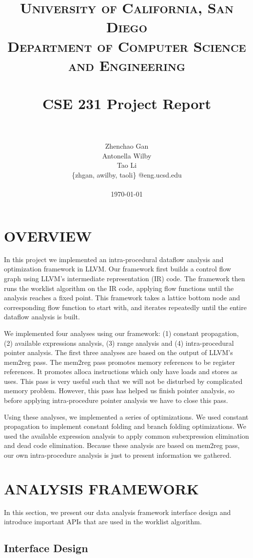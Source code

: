 \documentclass[paper=letter, fontsize=11pt]{scrartcl}
\title{
		\vspace{-0.5in} 	
		\usefont{OT1}{bch}{b}{n}
		\normalfont \normalsize \textsc{University of California, San Diego \\
								Department of Computer Science and Engineering } \\ [25pt]
		\horrule{0.5pt} \\[0.4cm]
		\huge CSE 231 Project Report\\
		\horrule{2pt} \\[0.5cm]
}
\author{
		\normalfont 						\normalsize
        				Zhenchao Gan\\[-3pt]		\normalsize
				Antonella Wilby\\[-3pt]		\normalsize
        				Tao Li\\[-3pt]				\normalsize
				\{zhgan, awilby, taoli\} @eng.ucsd.edu \\ \\
       		 \today
}
\date{}
\numberwithin{equation}{section}		%
\numberwithin{figure}{section}			%
\numberwithin{table}{section}				%
\begin{document}
\maketitle
\section{OVERVIEW}

In this project we implemented an intra-procedural dataflow analysis and optimization framework in LLVM.  Our framework first builds a control flow graph using LLVM's intermediate representation (IR) code. The framework then runs the worklist algorithm on the IR code, applying flow functions until the analysis reaches a fixed point. This framework takes a lattice bottom node and corresponding flow function to start with, and iterates repeatedly until the entire dataflow analysis is built. 

We implemented four analyses using our framework: (1) constant propagation, (2) available expressions analysis, (3) range analysis and (4) intra-procedural pointer analysis. The first three analyses are based on the output of LLVM's mem2reg pass. The mem2reg pass promotes memory references to be register references. It promotes alloca instructions which only have loads and stores as uses. This pass is very useful such that we will not be disturbed by complicated memory problem. However, this pass has helped us finish pointer analysis, so before applying intra-procedure pointer analysis we have to close this pass.

Using these analyses, we implemented a series of optimizations. We used constant propagation to implement constant folding and branch folding optimizations. We used the available expression analysis to apply common subexpression elimination and dead code elimination.  Because these analysis are based on mem2reg pass, our own intra-procedure analysis is just to present information we gathered.


\section{ANALYSIS FRAMEWORK}

In this section, we present our data analysis framework interface design and introduce important APIs that are used in the worklist algorithm.

\subsection{Interface Design}
\end{document}
